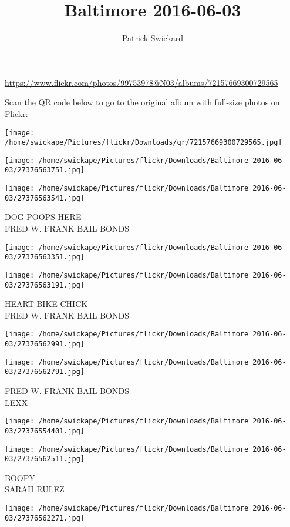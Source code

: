 \documentclass[10pt,letterpaper]{article}
\title{Baltimore 2016-06-03}
\author{Patrick Swickard}
\date{}
\begin{document}
\maketitle

\url{https://www.flickr.com/photos/99753978@N03/albums/72157669300729565}

Scan the QR code below to go to the original album with full-size photos on Flickr:

\texttt{[image: /home/swickape/Pictures/flickr/Downloads/qr/72157669300729565.jpg]}
\pagebreak

\texttt{[image: /home/swickape/Pictures/flickr/Downloads/Baltimore 2016-06-03/27376563751.jpg]}

\vspace{0.25in}
\texttt{[image: /home/swickape/Pictures/flickr/Downloads/Baltimore 2016-06-03/27376563541.jpg]}

DOG POOPS HERE\\
FRED W. FRANK BAIL BONDS
\pagebreak

\texttt{[image: /home/swickape/Pictures/flickr/Downloads/Baltimore 2016-06-03/27376563351.jpg]}

\vspace{0.25in}
\texttt{[image: /home/swickape/Pictures/flickr/Downloads/Baltimore 2016-06-03/27376563191.jpg]}

HEART BIKE CHICK\\
FRED W. FRANK BAIL BONDS
\pagebreak

\texttt{[image: /home/swickape/Pictures/flickr/Downloads/Baltimore 2016-06-03/27376562991.jpg]}

\vspace{0.25in}
\texttt{[image: /home/swickape/Pictures/flickr/Downloads/Baltimore 2016-06-03/27376562791.jpg]}

FRED W. FRANK BAIL BONDS\\
LEXX
\pagebreak

\texttt{[image: /home/swickape/Pictures/flickr/Downloads/Baltimore 2016-06-03/27376554401.jpg]}

\vspace{0.25in}
\texttt{[image: /home/swickape/Pictures/flickr/Downloads/Baltimore 2016-06-03/27376562511.jpg]}

BOOPY\\
SARAH RULEZ
\pagebreak

\texttt{[image: /home/swickape/Pictures/flickr/Downloads/Baltimore 2016-06-03/27376562271.jpg]}
\end{document}
